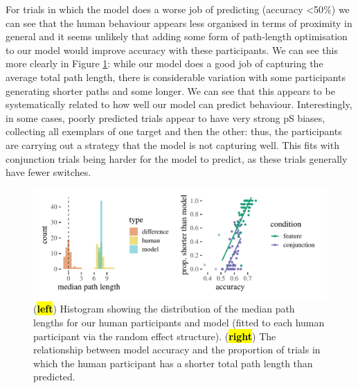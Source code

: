 \documentclass[vision,article,accept,pdftex,moreauthors]{Definitions/mdpi}
\begin{document}
For trials in which the model does a worse job of predicting (accuracy <50$\%$) we can see that the human behaviour appears less organised in terms of proximity in general and it seems unlikely that adding some form of path-length optimisation to our model would improve accuracy with these participants. We can see this more clearly in Figure \ref{fig:qjep_path_lengths}: while our model does a good job of capturing the average total path length, there is considerable variation with some participants generating shorter paths and some longer. We can see  that this appears to be systematically related to how well our model can predict behaviour. Interestingly, in some cases, poorly predicted trials appear to have very strong pS biases, collecting all exemplars of one target and then the other: thus, the participants are carrying out a strategy that the model is not capturing well. This fits with conjunction trials being harder for the model to predict, as these trials generally have fewer switches. 
\vspace{-10pt}
\begin{figure}[H]
\includegraphics[width=13.5 cm]{Figures/path_length.pdf}
\caption{({\textbf{\hl{left}}}) Histogram showing the distribution of the median path lengths for our human participants and model (fitted to each human participant via the random effect structure). (\textbf{\hl{right}}) The relationship between model accuracy and the proportion of trials in which the human participant has a shorter total path length than predicted.}%

\label{fig:qjep_path_lengths}
\end{figure} 
\end{document}
